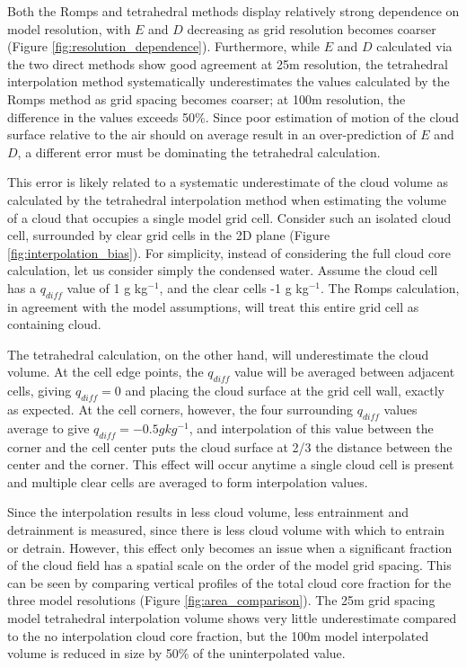 \documentclass[12pt]{article}
\begin{document}
Both the Romps and tetrahedral methods display relatively strong dependence 
on model resolution, with $E$ and $D$ decreasing as grid resolution becomes 
coarser (Figure \ref{fig:resolution_dependence}).  Furthermore, while $E$ 
and $D$ calculated via the two direct methods show good agreement at 25m 
resolution, the tetrahedral interpolation method systematically 
underestimates the values calculated by the Romps method as grid spacing 
becomes coarser; at 100m resolution, the difference in the values exceeds 
50\%.  Since poor estimation of motion of the cloud surface relative to the 
air should on average result in an over-prediction of $E$ and $D$, a 
different error must be dominating the tetrahedral calculation.

This error is likely related to a systematic underestimate of the cloud volume 
as calculated by the tetrahedral interpolation method when estimating the 
volume of a cloud that occupies a single model grid cell.  Consider such an 
isolated cloud cell, surrounded by clear grid cells in the 2D plane (Figure 
\ref{fig:interpolation_bias}).  For simplicity, instead of considering the 
full cloud core calculation, let us consider simply the condensed water.
Assume the cloud cell has a $q_{diff}$ value of 1 g kg$^{-1}$, and the clear 
cells -1 g kg$^{-1}$.  The Romps calculation, in agreement with the model 
assumptions, will treat this entire grid cell as containing cloud.

The tetrahedral calculation, on the other hand, will underestimate the cloud 
volume.  At the cell edge points, the $q_{diff}$ value will be averaged between
adjacent cells, giving $q_{diff} = 0$ and placing the cloud surface at the grid 
cell wall, exactly as expected.  At the cell corners, however, the four 
surrounding $q_{diff}$ values average to give $q_{diff} = -0.5 g kg^{-1}$, and 
interpolation of this value between the corner and the cell center puts the 
cloud surface at 2/3 the distance between the center and the corner.  This 
effect will occur anytime a single cloud cell is present and multiple clear 
cells are averaged to form interpolation values.

Since the interpolation results in less cloud volume, less entrainment and 
detrainment is measured, since there is less cloud volume with which to 
entrain or detrain.  However, this effect only becomes an issue when a 
significant fraction of the cloud field has a spatial scale on the order of 
the model grid spacing.  This can be seen by comparing vertical profiles of 
the total cloud core fraction for the three model resolutions (Figure 
\ref{fig:area_comparison}).  The 25m grid spacing model tetrahedral 
interpolation volume shows very little underestimate compared to the no 
interpolation cloud core fraction, but the 100m model interpolated volume is 
reduced in size by 50\% of the uninterpolated value.
\end{document}
